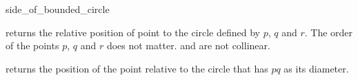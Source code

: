 \begin{ccRefFunction}{side_of_bounded_circle}

         {returns the relative position of point 
          to the circle defined by $p$, $q$ and $r$. The order
          of the points $p$, $q$ and $r$ does not matter.
          \ccPrecond {} and  are not collinear.}

  {returns the position of the point  relative to the circle
   that has $pq$ as its diameter.}

\end{ccRefFunction}
